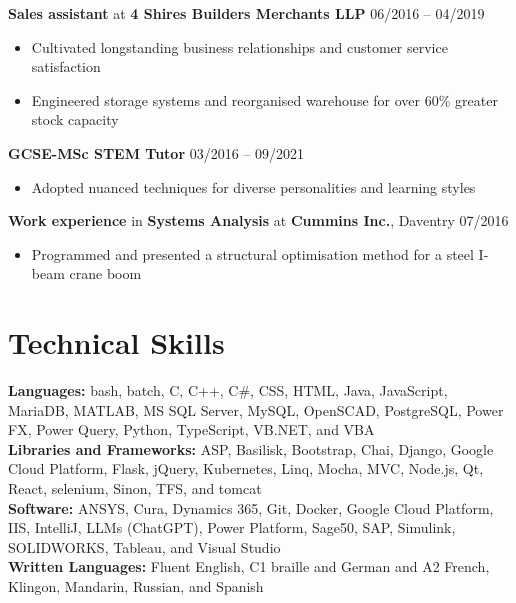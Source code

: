 \documentclass[10pt,a4paper]{article}
\begin{document}
\textbf{Sales assistant} at \textbf{4 Shires Builders Merchants LLP} \hfill 06/2016 -- 04/2019\vspace{-\baselineskip}\medskip
\begin{itemize}[noitemsep]
   \item Cultivated longstanding business relationships and customer service satisfaction
   \item Engineered storage systems and reorganised warehouse for over 60\% greater stock capacity
\end{itemize}
\textbf{GCSE-MSc STEM Tutor} \hfill 03/2016 -- 09/2021\vspace{-\baselineskip}\medskip
\begin{itemize}[noitemsep]
   \item Adopted nuanced techniques for diverse personalities and learning styles
\end{itemize}
\textbf{Work experience} in \textbf{Systems Analysis} at \textbf{Cummins Inc.}, Daventry \hfill 07/2016\vspace{-\baselineskip}\medskip
\begin{itemize}[noitemsep]
   \item Programmed and presented a structural optimisation method for a steel I-beam crane boom
\end{itemize}

\section*{Technical Skills}\vspace{-\baselineskip}\medskip
\textbf{Languages:} bash, batch, C, C++, C\#, CSS, HTML, Java, JavaScript, MariaDB, MATLAB, MS SQL Server, MySQL, OpenSCAD, PostgreSQL, Power FX, Power Query, Python, TypeScript, VB.NET, and VBA\smallskip\\
\textbf{Libraries and Frameworks:} ASP, Basilisk, Bootstrap, Chai, Django, Google Cloud Platform, Flask, jQuery, Kubernetes, Linq, Mocha, MVC, Node.js, Qt, React, selenium, Sinon, TFS, and tomcat\smallskip\\
\textbf{Software:} ANSYS, Cura, Dynamics 365, Git, Docker, Google Cloud Platform, IIS, IntelliJ, LLMs (ChatGPT), Power Platform, Sage50, SAP, Simulink, SOLIDWORKS, Tableau, and Visual Studio\smallskip\\
\textbf{Written Languages:} Fluent English, C1 braille and German and A2 French, Klingon, Mandarin, Russian, and Spanish
\end{document}
